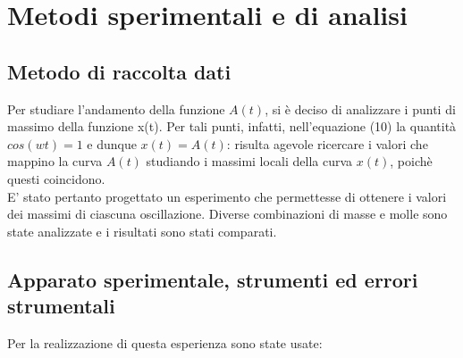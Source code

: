 \documentclass{article}
\begin{document}
\section{Metodi sperimentali e di analisi}
\subsection{Metodo di raccolta dati }

    
Per studiare l'andamento della funzione $A(t)$, si è deciso di analizzare i punti di massimo della funzione x(t). Per tali punti, infatti,  nell'equazione (10) la quantità $cos(wt)=1$ e dunque $x(t)=A(t)$: risulta agevole ricercare i valori che mappino la curva $A(t)$ studiando i massimi locali della curva $x(t)$, poichè questi coincidono.\\
E' stato pertanto progettato un esperimento che permettesse di ottenere i valori dei massimi di ciascuna oscillazione. Diverse combinazioni di masse e molle sono state analizzate e i risultati sono stati comparati. 

   
\subsection{Apparato sperimentale, strumenti ed errori strumentali}
Per la realizzazione di questa esperienza sono state usate:
\end{document}
